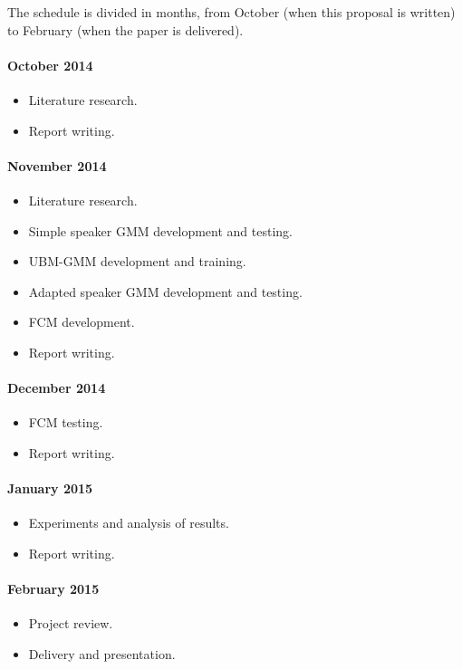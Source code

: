 \documentclass[a4paper,twocolumn]{article}
\begin{document}
The schedule is divided in months, from October (when this proposal is written) to February (when the paper is delivered).

\paragraph{\textbf{October 2014}}
\begin{itemize}[noitemsep]
    \item Literature research.
    \item Report writing.
\end{itemize}

\paragraph{\textbf{November 2014}}
\begin{itemize}[noitemsep]
    \item Literature research.
    \item Simple speaker GMM development and testing.
    \item UBM-GMM development and training.
    \item Adapted speaker GMM development and testing.
    \item FCM development.
    \item Report writing.
\end{itemize}

\paragraph{\textbf{December 2014}}
\begin{itemize}[noitemsep]
    \item FCM testing.
    \item Report writing.
\end{itemize}

\paragraph{\textbf{January 2015}}
\begin{itemize}[noitemsep]
    \item Experiments and analysis of results.
    \item Report writing.
\end{itemize}

\paragraph{\textbf{February 2015}}
\begin{itemize}[noitemsep]
    \item Project review.
    \item Delivery and presentation.
\end{itemize}
\end{document}
